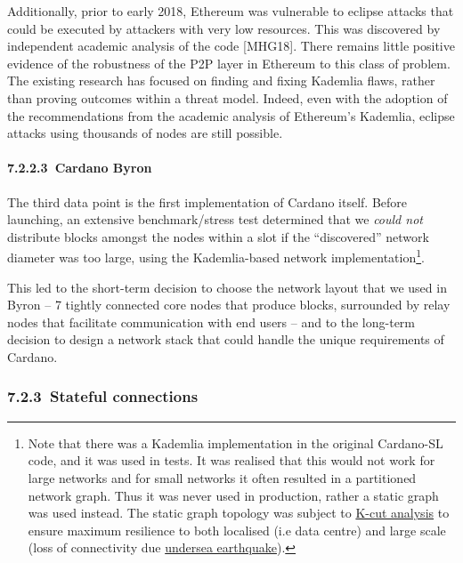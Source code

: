\documentclass[]{article}
\let\oldparagraph\paragraph
\renewcommand{\paragraph}[1]{\oldparagraph{#1}\mbox{}}
\begin{document}
Additionally, prior to early 2018, Ethereum was vulnerable to eclipse
attacks that could be executed by attackers with very low resources.
This was discovered by independent academic analysis of the code
{[}MHG18{]}. There remains little positive evidence of the robustness of
the P2P layer in Ethereum to this class of problem. The existing
research has focused on finding and fixing Kademlia flaws, rather than
proving outcomes within a threat model. Indeed, even with the adoption
of the recommendations from the academic analysis of Ethereum's
Kademlia, eclipse attacks using thousands of nodes are still possible.

\hypertarget{cardano-byron}{%
\paragraph{​7.2.2.3​~Cardano Byron}\label{cardano-byron}}

The third data point is the first implementation of Cardano itself.
Before launching, an extensive benchmark/stress test determined that we
\emph{could not} distribute blocks amongst the nodes within a slot if
the ``discovered'' network diameter was too large, using the
Kademlia-based network implementation\footnote{Note that there was a
  Kademlia implementation in the original Cardano-SL code, and it was
  used in tests. It was realised that this would not work for large
  networks and for small networks it often resulted in a partitioned
  network graph. Thus it was never used in production, rather a static
  graph was used instead. The static graph topology was subject to
  \href{https://en.wikipedia.org/wiki/Minimum_k-cut}{{K-cut analysis}}
  to ensure maximum resilience to both localised (i.e data centre) and
  large scale (loss of connectivity due
  \href{https://www.telecomramblings.com/2010/06/subsea-quakes-and-transatlantic-cable-diversity/}{{undersea
  earthquake}}).}.

This led to the short-term decision to choose the network layout that we
used in Byron -- 7 tightly connected core nodes that produce blocks,
surrounded by relay nodes that facilitate communication with end users
-- and to the long-term decision to design a network stack that could
handle the unique requirements of Cardano.

\hypertarget{stateful-connections}{%
\subsubsection{​7.2.3​~Stateful
connections}\label{stateful-connections}}
\end{document}
